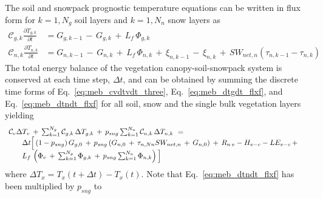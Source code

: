 {%

The soil and snowpack prognostic temperature equations can be
written in flux form for $k=1,N_g$ soil layers and $k=1,N_n$ snow layers as
%
\begin{align}
\label{eq:meb_dtgdt_flxf}
%
{\mathcal{C}}_{g,k}{\frac{\partial T_{g,k}}{\partial t}} &= 
G_{g,k-1} \,-\,G_{g,k} \,+\, L_f \, \Phi_{g,k}
%
\\
\label{eq:meb_dtndt_flxf}
{\mathcal{C}}_{n,k}{\frac{\partial T_{n,k}}{\partial t}} &= 
G_{n,k-1} \,-\,G_{n,k} \,+\, L_f \, \Phi_{n,k}
\,+\, \xi_{n,k-1} \,-\, \xi_{n,k}
\,+\, SW_{net,n} \left(\tau_{n,k-1}-\tau_{n,k} \right)
\end{align}
%
The total energy balance of the vegetation canopy-soil-snowpack system is conserved
at each time step, $\Delta t$, and can be obtained by summing the discrete time forms of
Eq.~\ref{eq:meb_cvdtvdt_three}, 
Eq.~\ref{eq:meb_dtgdt_flxf}, and Eq.~\ref{eq:meb_dtndt_flxf} for all soil, snow
and the single bulk vegetation layers yielding
%
\begin{align}
\begin{array}{ll}
\label{eq:meb_budget_dtdt_three}
%
     {\mathcal C}_v {\Delta T_v} 
\,+\, \sum_{k=1}^{N_g}{\mathcal C}_{g,k} \, {\Delta T_{g,k}}
\,+\, p_{sng} \sum_{k=1}^{N_n} {\mathcal C}_{n,k} \, {\Delta T_{n,k}}
\,\,=\,\,
\\
\hskip.25in
%
\Delta t 
\Big\lbrack 
\left(1-p_{sng}\right) 
G_{g,0} \,+\, 
p_{sng} \left(
G_{n,0}  \,+\, \tau_{n,Nn}SW_{net,n} \,+\, G_{n,0}
\right)
\,+\, R_{n\,v} - H_{v-c} - LE_{v-c}
\,+\, 
\\
\hskip.25in
L_f\,\left(
\Phi_{v} 
\,+\, \sum_{k=1}^{N_g} \Phi_{g,k} 
\,+\, p_{sng}\sum_{k=1}^{N_n} \Phi_{n,k} 
\right)
\Big\rbrack
&
%
\end{array}
\end{align}
%
%
where $\Delta T_x = T_x(t+\Delta t) - T_x(t)$.
%
Note that Eq.~\ref{eq:meb_dtndt_flxf} has been multiplied by $p_{sng}$ to
}
